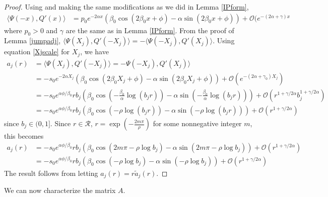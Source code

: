 \documentclass[thesis.tex]{subfiles}
\begin{document}
\begin{lemma}
\begin{proof}
Using \cite[Lemma 6.1]{Sandstede1998} and making the same modifications as we did in Lemma \ref{IPform},
\begin{align*}\label{IPpsiQprime}
\langle \Psi(-x), Q'(x) \rangle
&= p_0 e^{-2 \alpha x}\left( \beta_0 \cos(2 \beta_0 x + \phi) - \alpha \sin(2 \beta_0 x + \phi)\right) + \mathcal{O}(e^{-(2 \alpha + \gamma) x}
\end{align*}
where $p_0 > 0$ and $\gamma$ are the same as in Lemma \ref{IPform}. From the proof of Lemma \ref{jumpadj}, $\langle \Psi(X_j), Q'(-X_j) \rangle = - \langle \Psi(-X_j), Q'(X_j) \rangle$. Using equation \cref{Xjscale} for $X_j$, we have
\begin{align*}
a_j(r) &= \langle \Psi(X_j), Q'(-X_j) \rangle = -\Psi(-X_j), Q'(X_j) \rangle \\
&= -s_0 e^{-2 \alpha X_j}\left( \beta_0 \cos(2 \beta_0 X_j + \phi) - \alpha \sin(2 \beta_0 X_j + \phi)\right) + \mathcal{O}(e^{-(2 \alpha + \gamma_0) X_j}) \\
&= -s_0 e^{\alpha \phi/\beta_0} r b_j \left( \beta_0 \cos\left( -\frac{\beta_0}{\alpha} \log(b_j r) \right) - \alpha \sin \left( -\frac{\beta_0}{\alpha} \log(b_j r) \right) \right) + \mathcal{O}(r^{1+\gamma/2\alpha} b_j^{1 + \gamma/2\alpha}) \\
&= -s_0 e^{\alpha \phi/\beta_0} r b_j \left( \beta_0 \cos\left( -\rho \log(b_j r) \right) - \alpha \sin \left( -\rho \log(b_j r) \right) \right) + \mathcal{O}(r^{1+\gamma/2\alpha})
\end{align*}
since $b_j \in (0, 1]$. Since $r \in \mathcal{R}$, $r = \exp\left(-\frac{2 m \pi}{\rho}\right)$ for some nonnegative integer $m$, this becomes 
\begin{align*}
a_j(r) &= -s_0 e^{\alpha \phi/\beta_0} r b_j \left( \beta_0 \cos\left( 2 m \pi -\rho \log b_j \right) - \alpha \sin \left( 2 m \pi -\rho \log b_j \right) \right) + \mathcal{O}(r^{1+\gamma/2\alpha}) \\
&= -s_0 e^{\alpha \phi/\beta_0} r b_j \left( \beta_0 \cos\left(-\rho \log b_j \right) - \alpha \sin \left(-\rho \log b_j \right) \right) + \mathcal{O}(r^{1+\gamma/2\alpha})
\end{align*}
The result follows from letting $a_j(r) = r \tilde{a}_j(r)$.
\end{proof}
\end{lemma}

We can now characterize the matrix $A$.
\end{document}
